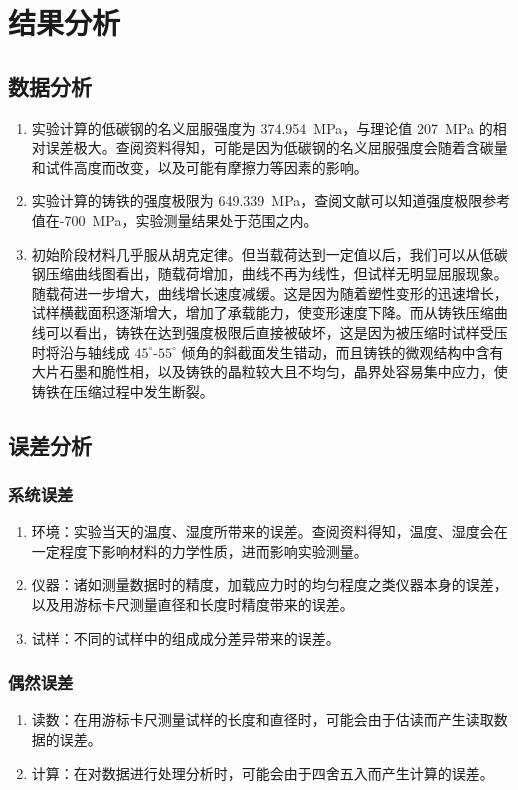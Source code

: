 \documentclass[a4paper,utf8]{article}
\begin{document}
\section{结果分析}
    \subsection{数据分析}
        \begin{enumerate}
            \item 实验计算的低碳钢的名义屈服强度为 \SI{374.954}{\MPa}，与理论值 \SI{207}{\MPa} 的相对误差极大。查阅资料得知，可能是因为低碳钢的名义屈服强度会随着含碳量和试件高度而改变，以及可能有摩擦力等因素的影响。
            \item 实验计算的铸铁的强度极限为 \SI{649.339}{\MPa}，查阅文献可以知道强度极限参考值在-\SI{700}{\MPa}，实验测量结果处于范围之内。
            \item 初始阶段材料几乎服从胡克定律。但当载荷达到一定值以后，我们可以从低碳钢压缩曲线图看出，随载荷增加，曲线不再为线性，但试样无明显屈服现象。随载荷进一步增大，曲线增长速度减缓。这是因为随着塑性变形的迅速增长，试样横截面积逐渐增大，增加了承载能力，使变形速度下降。而从铸铁压缩曲线可以看出，铸铁在达到强度极限后直接被破坏，这是因为被压缩时试样受压时将沿与轴线成 $45^\circ$-$55^\circ$ 倾角的斜截面发生错动，而且铸铁的微观结构中含有大片石墨和脆性相，以及铸铁的晶粒较大且不均匀，晶界处容易集中应力，使铸铁在压缩过程中发生断裂。
        \end{enumerate}
    \subsection{误差分析}
    \subsubsection{系统误差}
    \begin{enumerate}
        \item 环境：实验当天的温度、湿度所带来的误差。查阅资料得知，温度、湿度会在一定程度下影响材料的力学性质，进而影响实验测量。
        \item 仪器：诸如测量数据时的精度，加载应力时的均匀程度之类仪器本身的误差，以及用游标卡尺测量直径和长度时精度带来的误差。
        \item 试样：不同的试样中的组成成分差异带来的误差。
    \end{enumerate}
    \subsubsection{偶然误差}
    \begin{enumerate}
        \item 读数：在用游标卡尺测量试样的长度和直径时，可能会由于估读而产生读取数据的误差。
        \item 计算：在对数据进行处理分析时，可能会由于四舍五入而产生计算的误差。
    \end{enumerate}
\end{document}
